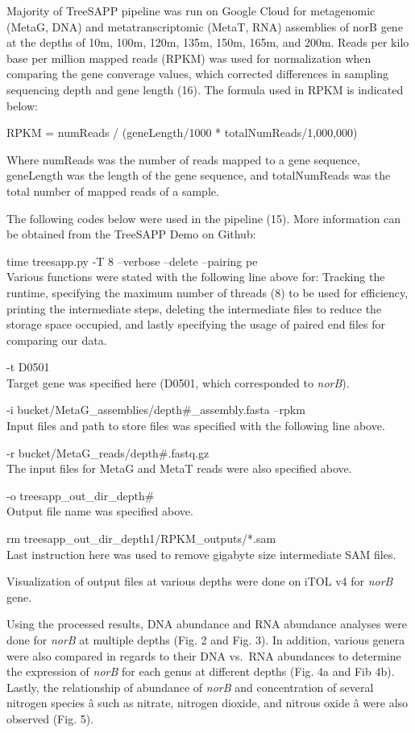 \documentclass[11 pt,]{article}
\begin{document}
Majority of TreeSAPP pipeline was run on Google Cloud for metagenomic
(MetaG, DNA) and metatranscriptomic (MetaT, RNA) assemblies of norB gene
at the depths of 10m, 100m, 120m, 135m, 150m, 165m, and 200m. Reads per
kilo base per million mapped reads (RPKM) was used for normalization
when comparing the gene converage values, which corrected differences in
sampling sequencing depth and gene length (16). The formula used in RPKM
is indicated below:

RPKM = numReads / (geneLength/1000 * totalNumReads/1,000,000)

Where numReads was the number of reads mapped to a gene sequence,
geneLength was the length of the gene sequence, and totalNumReads was
the total number of mapped reads of a sample.

The following codes below were used in the pipeline (15). More
information can be obtained from the TreeSAPP Demo on Github:

time treesapp.py -T 8 --verbose --delete --pairing pe\\
Various functions were stated with the following line above for:
Tracking the runtime, specifying the maximum number of threads (8) to be
used for efficiency, printing the intermediate steps, deleting the
intermediate files to reduce the storage space occupied, and lastly
specifying the usage of paired end files for comparing our data.

-t D0501\\
Target gene was specified here (D0501, which corresponded to
\emph{norB}).

-i bucket/MetaG\_assemblies/depth\#\_assembly.fasta --rpkm\\
Input files and path to store files was specified with the following
line above.

-r bucket/MetaG\_reads/depth\#.fastq.gz\\
The input files for MetaG and MetaT reads were also specified above.

-o treesapp\_out\_dir\_depth\#\\
Output file name was specified above.

rm treesapp\_out\_dir\_depth1/RPKM\_outputs/*.sam\\
Last instruction here was used to remove gigabyte size intermediate SAM
files.

Visualization of output files at various depths were done on iTOL v4 for
\emph{norB} gene.

Using the processed results, DNA abundance and RNA abundance analyses
were done for \emph{norB} at multiple depths (Fig. 2 and Fig. 3). In
addition, various genera were also compared in regards to their DNA
vs.~RNA abundances to determine the expression of \emph{norB} for each
genus at different depths (Fig. 4a and Fib 4b). Lastly, the relationship
of abundance of \emph{norB} and concentration of several nitrogen
species â such as nitrate, nitrogen dioxide, and nitrous oxide â
were also observed (Fig. 5).
\end{document}
